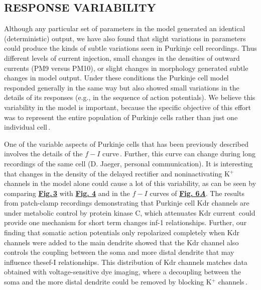 \documentclass[12pt]{article}
\begin{document}
\subsection*{RESPONSE VARIABILITY}

Although any particular set of parameters
in the model generated an identical (deterministic)
output, we have also found that slight variations in
parameters could produce the kinds of subtle variations
seen in Purkinje cell recordings. Thus different levels of
current injection, small changes in the densities of outward
currents (PM9 versus PM10), or slight changes in morphology
generated subtle changes in model output. Under these
conditions the Purkinje cell model responded generally in
the same way but also showed small variations in the details
of its responses (e.g., in the sequence of action potentials).
We believe this variability in the model is important, because
the specific objective of this effort was to represent the
entire population of Purkinje cells rather than just one individual
cell\,\cite{Bower:1992vn}.

One of the variable aspects of Purkinje cells that has been
previously described involves the details of the $f-I$ curve\,\cite{R:1980ly}. Further, this curve can
change during long recordings of the same cell (D. Jaeger,
personal communication). It is interesting that changes in
the density of the delayed rectifier and noninactivating K$^+$
channels in the model alone could cause a lot of this variability,
as can be seen by comparing \href{../pub-purkinje-deschutter1-fig-3/pub-purkinje-deschutter1-fig-3.tex}{\bf Fig.\,3} with \href{../pub-purkinje-deschutter1-fig-4/pub-purkinje-deschutter1-fig-4.tex}{\bf Fig. 4} and in
the $f-I$ curves of \href{../pub-purkinje-deschutter1-fig-6/pub-purkinje-deschutter1-fig-6.tex}{\bf Fig. 6{\it A}}. The results from patch-clamp recordings
demonstrating that Purkinje cell Kdr channels are
under metabolic control by protein kinase C, which attenuates
Kdr current\,\cite{Linden:1992ys} could provide one
mechanism for short term changes inf-1 relationships. Further,
our finding that somatic action potentials only repolarized
completely when Kdr channels were added to the
main dendrite showed that the Kdr channel also controls
the coupling between the soma and more distal dendrite
that may influence thesef-I relationships. This distribution
of Kdr channels matches data obtained with voltage-sensitive
dye imaging, where a decoupling between the soma and
the more distal dendrite could be removed by blocking K$^+$
channels\,\cite{Knopfel:1990zr}.



\end{document}
